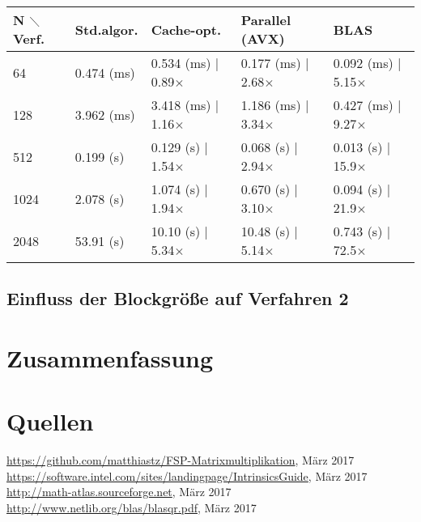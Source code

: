 \documentclass[a4paper,11pt]{scrartcl}
\begin{document}
\begin{tabular}{| l | l || l || l || l |}
\hline
N $\diagdown$ Verf. & Std.algor. & Cache-opt. & Parallel (AVX) & BLAS  \\ \hline

64 & 0.474 (ms) & 0.534 (ms) | 0.89$\times$ & 0.177 (ms) | 2.68$\times$ & 0.092 (ms) | 5.15$\times$  \\ \hline

128 & 3.962 (ms) & 3.418 (ms) | 1.16$\times$ & 1.186 (ms) | 3.34$\times$ & 0.427 (ms) | 9.27$\times$  \\ \hline
512 & 0.199 (s) & 0.129 (s) | 1.54$\times$ & 0.068 (s) | 2.94$\times$ & 0.013 (s) | 15.9$\times$  \\ \hline
1024 & 2.078 (s) &  1.074 (s) | 1.94$\times$ & 0.670 (s) | 3.10$\times$ & 0.094 (s) | 21.9$\times$ \\ \hline
2048 & 53.91 (s) & 10.10 (s) | 5.34$\times$ & 10.48 (s) | 5.14$\times$ & 0.743 (s) | 72.5$\times$ \\ \hline
 
		 			

\end{tabular}\newline





\subsection{Einfluss der Blockgröße auf Verfahren 2}



\section{Zusammenfassung}

\section{Quellen}
\begin{thebibliography}{9}

 \url{https://github.com/matthiastz/FSP-Matrixmultiplikation}, März 2017
 \url{https://software.intel.com/sites/landingpage/IntrinsicsGuide}, März 2017
 \url{http://math-atlas.sourceforge.net}, März 2017
 \url{http://www.netlib.org/blas/blasqr.pdf}, März 2017

\end{thebibliography}
\end{document}
